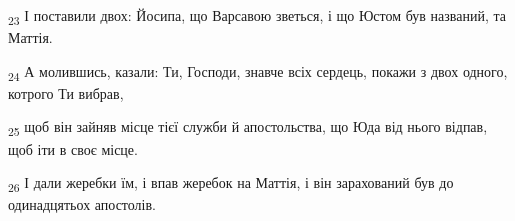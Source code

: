 \begin{tcolorbox}
\textsubscript{23} І поставили двох: Йосипа, що Варсавою зветься, і що Юстом був названий, та Маттія.
\end{tcolorbox}
\begin{tcolorbox}
\textsubscript{24} А молившись, казали: Ти, Господи, знавче всіх сердець, покажи з двох одного, котрого Ти вибрав,
\end{tcolorbox}
\begin{tcolorbox}
\textsubscript{25} щоб він зайняв місце тієї служби й апостольства, що Юда від нього відпав, щоб іти в своє місце.
\end{tcolorbox}
\begin{tcolorbox}
\textsubscript{26} І дали жеребки їм, і впав жеребок на Маттія, і він зарахований був до одинадцятьох апостолів.
\end{tcolorbox}
